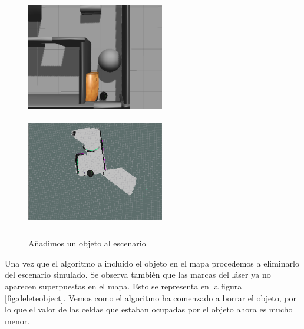 \begin{figure} [hbtp]
  \begin{center}
    \includegraphics[width=6cm,height=5cm]{img/cap7/incrementmap-object3}
    \includegraphics[width=6cm,height=5cm]{img/cap7/incrementmap-object}
  \end{center}
  \caption{Añadimos un objeto al escenario}
  \label{fig:includeobject}
\end{figure}

Una vez que el algoritmo a incluido el objeto en el mapa procedemos a eliminarlo del escenario simulado. Se observa también que las marcas del láser ya no aparecen superpuestas en el mapa. Esto se representa en la figura  \ref{fig:deleteobject}. Vemos como el algoritmo ha comenzado a borrar el objeto, por lo que el valor de las celdas que estaban ocupadas por el objeto ahora es mucho menor.

